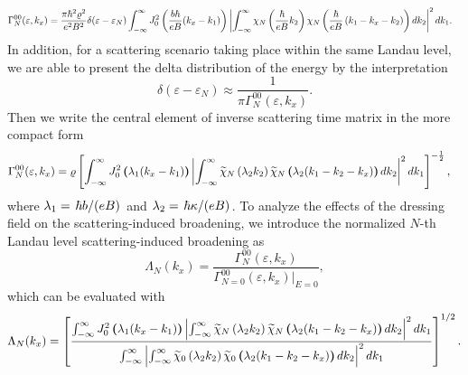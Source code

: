 \begin{widetext}
  \begin{equation} \label{eq:17}
   \begin{aligned}
     &\Gamma^{00}_{N} (\varepsilon,k_x) =
     \frac{ \pi \hbar^2 \varrho^2}{e^2B^2}
     \delta(\varepsilon - \varepsilon_{N})
     \int_{-\infty}^{\infty}
     J_0^2 \bm{\left(} \frac{b\hbar}{eB}({k}_x - k_1) \bm{\right)}
     \left|
     \int_{-\infty}^{\infty}
     \chi_N \left( \frac{\hbar}{eB}k_2 \right)
     \chi_N \bm{\left(} \frac{\hbar}{eB}
     \left( k_1 - {k}_x - k_2 \right) \bm{\right)}
     dk_2 \right|^2 d k_1.
   \end{aligned}
  \end{equation}
In addition, for a scattering scenario taking place within the same Landau level, we are able to present the delta distribution of the energy by the  interpretation \cite{dini16}
\begin{equation} \label{eq:18}
 \delta(\varepsilon - \varepsilon_{N}) \approx
 \frac{1}{\pi \Gamma^{00}_N (\varepsilon,k_x)}.
\end{equation}
Then we write the central element of inverse scattering time matrix in the more compact form
\begin{equation} \label{eq:19}
  \begin{aligned}
    &\Gamma^{00}_{N}(\varepsilon,k_x) =
     \varrho
      \left[
      \int_{-\infty}^{\infty}
      J_0^2 \bm{\left(} \lambda_1 (k_x - k_1) \bm{\right)}
      \left|
      \int_{-\infty}^{\infty}
      \widetilde{\chi}_{N}\left(\lambda_2 k_2 \right)
      \widetilde{\chi}_{N} \bm{\left(} \lambda_2 (k_1 - k_2 - k_x) \bm{\right)}
      dk_2 \right|^2
      dk_1
      \right]^{-\frac{1}{2}},
  \end{aligned}
\end{equation}
where $ \lambda_1 = \flatfrac{\hbar b}{(eB)}$ and  $\lambda_2 = \flatfrac{\hbar \kappa}{(eB)}$.
To analyze the effects of the dressing field on the scattering-induced broadening, we introduce the normalized $N$-th Landau level scattering-induced broadening as
\begin{equation} \label{eq:20}
    \Lambda_N(k_x) =
    \frac{\Gamma^{00}_N (\varepsilon,k_x)}
    {\Gamma^{00}_{N=0}(\varepsilon,k_x)\big|_{E=0}},
\end{equation}
which can be evaluated with
\begin{equation} \label{eq:21}
    \Lambda_N (k_x) =
    \left[
    \frac
    {
      \int_{-\infty}^{\infty}
      J_0^2 \bm{\left(} \lambda_1 (k_x - k_1) \bm{\right)}
      \left|
      \int_{-\infty}^{\infty}
      \widetilde{\chi}_{N}\left(\lambda_2 k_2 \right)
      \widetilde{\chi}_{N} \bm{\left(} \lambda_2 (k_1 - k_2 - k_x) \bm{\right)}
      dk_2 \right|^2
      dk_1
    }
    {
      \int_{-\infty}^{\infty}
      \left|
      \int_{-\infty}^{\infty}
      \widetilde{\chi}_0 \left(\lambda_2 k_2 \right)
      \widetilde{\chi}_0 \bm{\left(} \lambda_2 (k_1 - k_2 - k_x) \bm{\right)}
      dk_2 \right|^2
      dk_1
    }
    \right]^{1/2}.
\end{equation}
\end{widetext}

